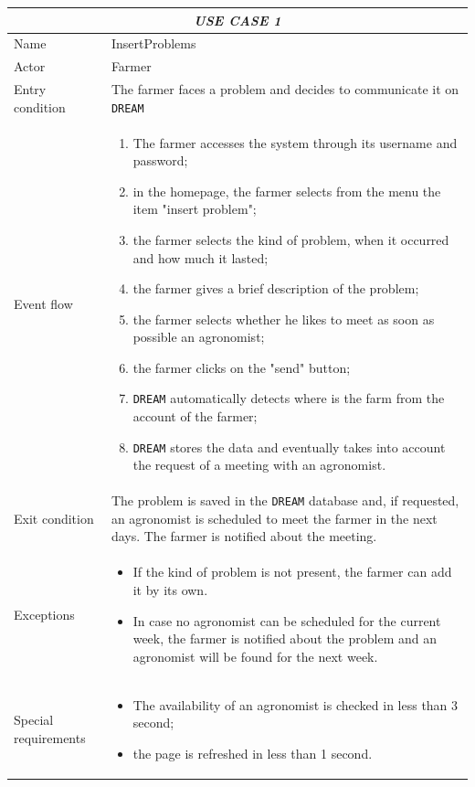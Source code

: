 \documentclass{article}
\begin{document}
\begin{tabular}{|p{3.5cm}|m{8cm}|}
 \hline
 \multicolumn{2}{|c|}{\emph{USE CASE 1}} \\
 \hline
 Name & InsertProblems\\
 \hline
 Actor & Farmer\\
 \hline
 Entry condition & The farmer faces a problem and decides to communicate it on \verb|DREAM|\\
 \hline
 Event flow & \begin{enumerate}
    \item The farmer accesses the system through its username and password;
    \item in the homepage, the farmer selects from the menu the item "insert problem";
    \item the farmer selects the kind of problem, when it occurred and how much it lasted;
    \item the farmer gives a brief description of the problem;
    \item the farmer selects whether he likes to meet as soon as possible an agronomist;
    \item the farmer clicks on the "send" button;
    \item \verb|DREAM| automatically detects where is the farm from the account of the farmer;
    \item \verb|DREAM| stores the data and eventually takes into account the request of a meeting with an agronomist.
 \end{enumerate}\\
 \hline
 Exit condition & The problem is saved in the \verb|DREAM| database and, if requested, an agronomist is scheduled to meet the farmer in the next days. The farmer is notified about the meeting.\\
 \hline
 Exceptions & \begin{itemize}
     \item If the kind of problem is not present, the farmer can add it by its own.
     \item In case no agronomist can be scheduled for the current week, the farmer is notified about the problem and an agronomist will be found for the next week.
 \end{itemize}\\
 \hline
 Special requirements & \begin{itemize}
     \item The availability of an agronomist is checked in less than 3 second;
     \item the page is refreshed in less than 1 second.
 \end{itemize}\\
 \hline
\end{tabular}
\end{document}
